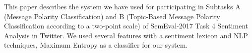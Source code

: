 This paper describes the system we have used for participating in Subtasks A (Message Polarity Classification) and B (Topic-Based Message Polarity Classification according to a two-point scale) of SemEval-2017 Task 4 Sentiment Analysis in Twitter. We used several features with a sentiment lexicon and NLP techniques, Maximum Entropy as a classifier for our system.
